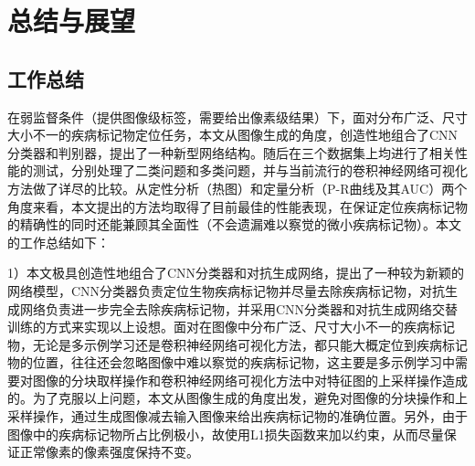 \chapter{总结与展望}
\section{工作总结}

在弱监督条件（提供图像级标签，需要给出像素级结果）下，面对分布广泛、尺寸大小不一的疾病标记物定位任务，本文从图像生成的角度，创造性地组合了CNN分类器和判别器，提出了一种新型网络结构。随后在三个数据集上均进行了相关性能的测试，分别处理了二类问题和多类问题，并与当前流行的卷积神经网络可视化方法做了详尽的比较。从定性分析（热图）和定量分析（P-R曲线及其AUC）两个角度来看，本文提出的方法均取得了目前最佳的性能表现，在保证定位疾病标记物的精确性的同时还能兼顾其全面性（不会遗漏难以察觉的微小疾病标记物）。本文的工作总结如下：

1）本文极具创造性地组合了CNN分类器和对抗生成网络，提出了一种较为新颖的网络模型，CNN分类器负责定位生物疾病标记物并尽量去除疾病标记物，对抗生成网络负责进一步完全去除疾病标记物，并采用CNN分类器和对抗生成网络交替训练的方式来实现以上设想。面对在图像中分布广泛、尺寸大小不一的疾病标记物，无论是多示例学习还是卷积神经网络可视化方法，都只能大概定位到疾病标记物的位置，往往还会忽略图像中难以察觉的疾病标记物，这主要是多示例学习中需要对图像的分块取样操作和卷积神经网络可视化方法中对特征图的上采样操作造成的。为了克服以上问题，本文从图像生成的角度出发，避免对图像的分块操作和上采样操作，通过生成图像减去输入图像来给出疾病标记物的准确位置。另外，由于图像中的疾病标记物所占比例极小，故使用L1损失函数来加以约束，从而尽量保证正常像素的像素强度保持不变。

